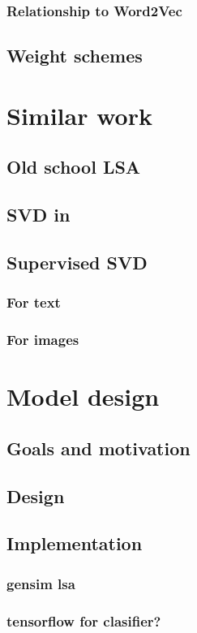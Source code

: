         \subsection{Relationship to Word2Vec}
        
    \section{Weight schemes}


\chapter{Similar work}
    \section{Old school LSA}
    \section{SVD in }
    \section{Supervised SVD}
        \subsection{For text}
        \subsection{For images}

\chapter{Model design}
    \section{Goals and motivation}
    \section{Design}
    \section{Implementation}
        \subsection{gensim lsa}
        \subsection{tensorflow for clasifier?}
    \*
